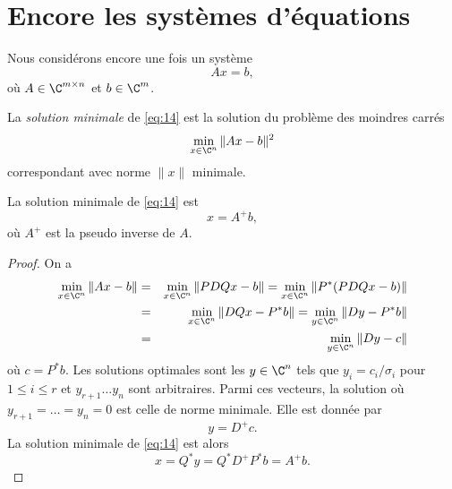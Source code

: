 \section{Encore les systèmes d'équations }
\label{sec:encore-les-systemes}
Nous considérons encore une fois un système 
\begin{equation}
  \label{eq:14}
  Ax = b, 
\end{equation}
où $A \in \C^{m \times n}$ et $b \in \C^m$. 

\begin{definition}
  \label{def:25}
  La \emph{solution minimale} de \eqref{eq:14} est 
  la solution du problème des moindres carrés
  \begin{displaymath}
    \min_{x \in \C^n} \|Ax - b\|^2 
  \end{displaymath}
    correspondant avec norme $\|x\|$ minimale.
\end{definition}



\begin{theorem}
  \label{thr:24}
  La solution minimale de \eqref{eq:14} est 
  \begin{displaymath}
    x = A^+ b,
  \end{displaymath}
où $A^+$ est la pseudo inverse de $A$. 
\end{theorem}

\begin{proof}
  On a 
  \begin{eqnarray*}
    \min_{x \in \C^n} \|Ax - b\| & = &      \min_{x \in \C^n} \|PDQx - b\| =     \min_{x \in \C^n} \|P^* (PDQx - b)\|        \\
     & = &     \min_{x \in \C^n} \|DQx - P^*b\| =     \min_{y \in \C^n} \|Dy - P^*b \| \\
      & = &       \min_{y \in \C^n} \|Dy - c \|
  \end{eqnarray*}
où $c  = P^*b$. Les solutions optimales sont les $y \in \C^n$ tels que $y_i = c_i / \sigma_i $ pour $1 \leq i \leq r$ et $y_{r+1} \dots y_n$ sont arbitraires. Parmi ces vecteurs, la solution où $y_{r+1} =\dots= y_n=0$ est celle de norme minimale. Elle est donnée par
\begin{displaymath}
  y = D^+ c. 
\end{displaymath}
La solution minimale de \eqref{eq:14} est alors 
\begin{displaymath}
  x = Q^*y = Q^* D^+ P^* b = A^+b. 
\end{displaymath}
\end{proof}

